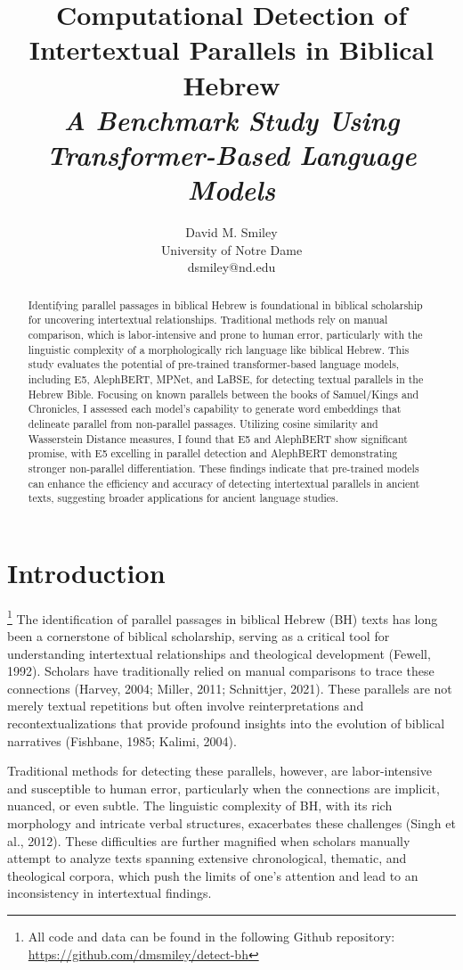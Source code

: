 \documentclass[12pt]{article}
\title{
    \LARGE\bfseries
    Computational Detection of \\
    Intertextual Parallels in Biblical Hebrew \\[1.2ex]
    \Large\itshape
    A Benchmark Study Using \\ Transformer-Based Language Models
}
\author{David M. Smiley\\University of Notre Dame\\dsmiley@nd.edu}
\date{}
\begin{document}
\maketitle

\begin{abstract}
Identifying parallel passages in biblical Hebrew is foundational in biblical scholarship for uncovering intertextual relationships. Traditional methods rely on manual comparison, which is labor-intensive and prone to human error, particularly with the linguistic complexity of a morphologically rich language like biblical Hebrew. This study evaluates the potential of pre-trained transformer-based language models, including E5, AlephBERT, MPNet, and LaBSE, for detecting textual parallels in the Hebrew Bible. Focusing on known parallels between the books of Samuel/Kings and Chronicles, I assessed each model’s capability to generate word embeddings that delineate parallel from non-parallel passages. Utilizing cosine similarity and Wasserstein Distance measures, I found that E5 and AlephBERT show significant promise, with E5 excelling in parallel detection and AlephBERT demonstrating stronger non-parallel differentiation. These findings indicate that pre-trained models can enhance the efficiency and accuracy of detecting intertextual parallels in ancient texts, suggesting broader applications for ancient language studies. \end{abstract}

\section{Introduction}
\footnote{All code and data can be found in the following Github repository: \url{https://github.com/dmsmiley/detect-bh}}
The identification of parallel passages in biblical Hebrew (BH) texts has long been a cornerstone of biblical scholarship, serving as a critical tool for understanding intertextual relationships and theological development (Fewell, 1992). Scholars have traditionally relied on manual comparisons to trace these connections (Harvey, 2004; Miller, 2011; Schnittjer, 2021). These parallels are not merely textual repetitions but often involve reinterpretations and recontextualizations that provide profound insights into the evolution of biblical narratives (Fishbane, 1985; Kalimi, 2004).

Traditional methods for detecting these parallels, however, are labor-intensive and susceptible to human error, particularly when the connections are implicit, nuanced, or even subtle. The linguistic complexity of BH, with its rich morphology and intricate verbal structures, exacerbates these challenges (Singh et al., 2012). These difficulties are further magnified when scholars manually attempt to analyze texts spanning extensive chronological, thematic, and theological corpora, which push the limits of one’s attention and lead to an inconsistency in intertextual findings.
\end{document}
